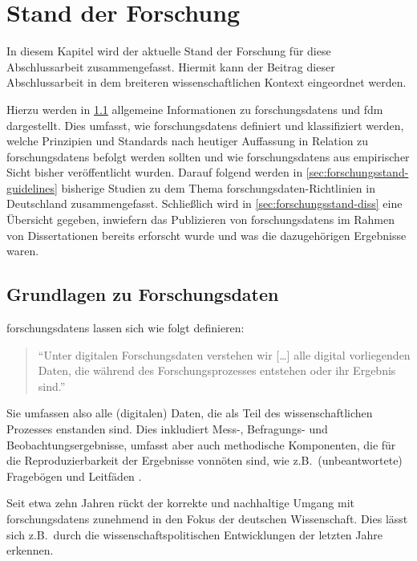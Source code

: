 \chapter{Stand der Forschung}\label{ch:forschungsstand}
In diesem Kapitel wird der aktuelle Stand der Forschung für diese Abschlussarbeit zusammengefasst. 
Hiermit kann der Beitrag dieser Abschlussarbeit in dem breiteren wissenschaftlichen Kontext eingeordnet werden.

Hierzu werden in \cref{sec:forschungsstand-basics} allgemeine Informationen zu \glspl{forschungsdaten} und \gls{fdm} dargestellt.
Dies umfasst, wie \glspl{forschungsdaten} definiert und klassifiziert werden, welche Prinzipien und Standards nach heutiger Auffassung in Relation zu \glspl{forschungsdaten} befolgt werden sollten und wie \glspl{forschungsdaten} aus empirischer Sicht bisher veröffentlicht wurden.
Darauf folgend werden in \cref{sec:forschungsstand-guidelines} bisherige Studien zu dem Thema \gls{forschungsdaten}-Richtlinien in Deutschland zusammengefasst.
Schließlich wird in \cref{sec:forschungsstand-diss} eine Übersicht gegeben, inwiefern das Publizieren von \glspl{forschungsdaten} im Rahmen von Dissertationen bereits erforscht wurde und was die dazugehörigen Ergebnisse waren.

\section{Grundlagen zu Forschungsdaten}\label{sec:forschungsstand-basics}
\glspl{forschungsdaten} lassen sich wie folgt definieren:
\begin{quote}
\enquote{Unter digitalen Forschungsdaten verstehen wir [\ldots] alle digital vorliegenden Daten, die während des Forschungsprozesses entstehen oder ihr Ergebnis sind.} \autocite[130]{Kindling2013}
\end{quote}
Sie umfassen also alle (digitalen) Daten, die als Teil des wissenschaftlichen Prozesses enstanden sind.
Dies inkludiert Mess-, Befragungs- und Beobachtungsergebnisse, umfasst aber auch methodische Komponenten, die für die Reproduzierbarkeit der Ergebnisse vonnöten sind, wie z.B.~(unbeantwortete) Fragebögen und Leitfäden \autocite{dfg-richtlinie}.

Seit etwa zehn Jahren rückt der korrekte und nachhaltige Umgang mit \glspl{forschungsdaten} zunehmend in den Fokus der deutschen Wissenschaft.
Dies lässt sich z.B.~durch die wissenschaftspolitischen Entwicklungen der letzten Jahre erkennen.

